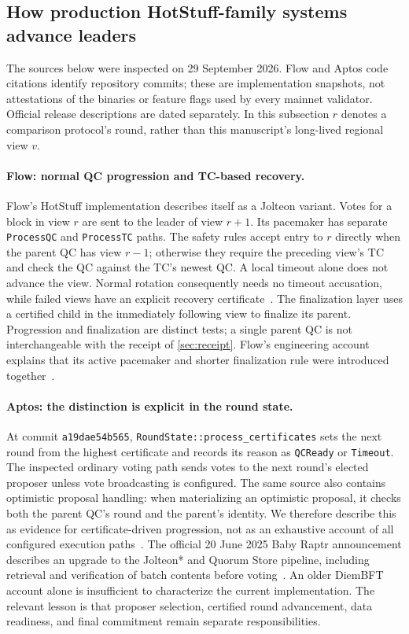 \subsection{How production HotStuff-family systems advance leaders}
\label{sec:production-rotation}
The sources below were inspected on 29 September 2026. Flow and Aptos code
citations identify repository commits; these are implementation snapshots,
not attestations of the binaries or feature flags used by every mainnet
validator. Official release descriptions are dated separately. In this
subsection $r$ denotes a comparison protocol's round, rather than this
manuscript's long-lived regional view $v$.

\paragraph{Flow: normal QC progression and TC-based recovery.}
Flow's HotStuff implementation describes itself as a Jolteon variant.
Votes for a block in view $r$ are sent to the leader of view $r+1$.
Its pacemaker has separate \texttt{ProcessQC} and \texttt{ProcessTC} paths.
The safety rules accept entry to $r$ directly when the parent QC has view
$r-1$; otherwise they require the preceding view's TC and check the QC
against the TC's newest QC. A local timeout alone does not advance the
view. Normal rotation consequently needs no timeout accusation, while
failed views have an explicit recovery certificate~\cite{flowcode}.
The finalization layer uses a certified child in the immediately following
view to finalize its parent. Progression and finalization are distinct
tests; a single parent QC is not interchangeable with the receipt of
\cref{sec:receipt}. Flow's engineering account explains that its active
pacemaker and shorter finalization rule were introduced together~\cite{flowjolteon}.

\paragraph{Aptos: the distinction is explicit in the round state.}
At commit \texttt{a19dae54b565}, \texttt{RoundState::process\_certificates}
sets the next round from the highest certificate and records its reason as
\texttt{QCReady} or \texttt{Timeout}. The inspected ordinary voting path
sends votes to the next round's elected proposer unless vote broadcasting
is configured. The same source also contains optimistic proposal handling:
when materializing an optimistic proposal, it checks both the parent QC's
round and the parent's identity. We therefore describe this as evidence
for certificate-driven progression, not as an exhaustive account of all
configured execution paths~\cite{aptosround,aptosmanager}.
The official 20 June 2025 Baby Raptr announcement describes an upgrade to
the Jolteon* and Quorum Store pipeline, including retrieval and verification
of batch contents before voting~\cite{aptosbaby}. An older DiemBFT account
alone is insufficient to characterize the current implementation. The
relevant lesson is that proposer selection, certified round advancement,
data readiness, and final commitment remain separate responsibilities.

